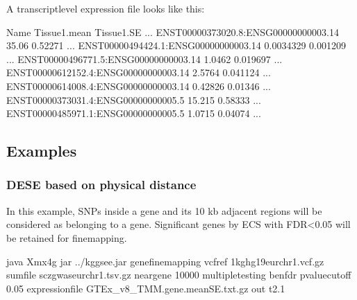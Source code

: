 \documentclass[letterpaper,10pt,english,openany,oneside]{sphinxmanual}
\begin{document}
\sphinxAtStartPar
A transcript\sphinxhyphen{}level expression file looks like this:

\begin{sphinxVerbatim}[commandchars=\\\{\}]
Name                                   Tissue1.mean   Tissue1.SE     ...
ENST00000373020.8:ENSG00000000003.14   35.06          0.52271        ...
ENST00000494424.1:ENSG00000000003.14   0.0034329      0.001209       ...
ENST00000496771.5:ENSG00000000003.14   1.0462         0.019697       ...
ENST00000612152.4:ENSG00000000003.14   2.5764         0.041124       ...
ENST00000614008.4:ENSG00000000003.14   0.42826        0.01346        ...
ENST00000373031.4:ENSG00000000005.5    15.215         0.58333        ...
ENST00000485971.1:ENSG00000000005.5    1.0715         0.04074        ...
\end{sphinxVerbatim}


\newpage
\subsection{Examples}
\label{\detokenize{detailed_document:id3}}

\subsubsection{DESE based on physical distance}
\label{\detokenize{detailed_document:dese-based-on-physical-distance}}
\sphinxAtStartPar
In this example, SNPs inside a gene and its 10 kb adjacent regions will be considered as belonging to a gene. Significant genes by ECS with FDR\textless{}0.05 will be retained for fine\sphinxhyphen{}mapping.

\begin{sphinxVerbatim}[commandchars=\\\{\}]
java \PYGZhy{}Xmx4g \PYGZhy{}jar ../kggsee.jar 
  \PYGZhy{}\PYGZhy{}gene\PYGZhy{}finemapping 
  \PYGZhy{}\PYGZhy{}vcf\PYGZhy{}ref 1kg\PYGZus{}hg19\PYGZus{}eur\PYGZus{}chr1.vcf.gz 
  \PYGZhy{}\PYGZhy{}sum\PYGZhy{}file scz\PYGZus{}gwas\PYGZus{}eur\PYGZus{}chr1.tsv.gz 
  \PYGZhy{}\PYGZhy{}neargene 10000 
  \PYGZhy{}\PYGZhy{}multiple\PYGZhy{}testing benfdr 
  \PYGZhy{}\PYGZhy{}p\PYGZhy{}value\PYGZhy{}cutoff 0.05 
  \PYGZhy{}\PYGZhy{}expression\PYGZhy{}file GTEx\_v8\_TMM.gene.meanSE.txt.gz 
  \PYGZhy{}\PYGZhy{}out t2.1
\end{sphinxVerbatim}
\end{document}
